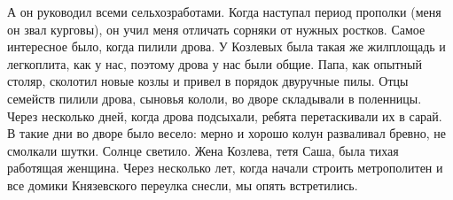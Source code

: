 \label{156-1}
А он руководил всеми сельхозработами. Когда наступал период прополки (меня он звал курговы), он учил меня отличать сорняки от нужных ростков. Самое интересное было, когда пилили дрова. У Козлевых была такая же жилплощадь и легкоплита, как у нас, поэтому дрова у нас были общие. Папа, как опытный столяр, сколотил новые козлы и привел в порядок двуручные пилы. Отцы семейств пилили дрова, сыновья кололи, во дворе складывали в поленницы. Через несколько дней, когда дрова подсыхали, ребята перетаскивали их в сарай. В такие дни во дворе было весело: мерно и хорошо колун разваливал бревно, не смолкали шутки. Солнце светило. Жена Козлева, тетя Саша, была тихая работящая женщина. Через несколько лет, когда начали строить метрополитен и все домики Князевского переулка снесли, мы опять встретились.
